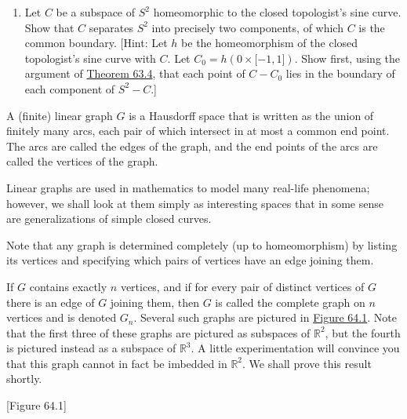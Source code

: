 \begin{enumerate}[itemsep=0.4em, parsep=0pt, topsep=0pt, partopsep=0pt, leftmargin=*, label=\arabic*., ref=\arabic*]
\begin{enumerate}[itemsep=0.2em, parsep=0pt, topsep=0pt, partopsep=0pt, leftmargin=*, label=(\alph*), align=left]
\begin{enumerate}[itemsep=0.2em, parsep=0pt, topsep=0pt, partopsep=0pt, leftmargin=*, label=(\alph*), align=left]
 \item Let \(C\) be a subspace of \(S^{2}\) homeomorphic to the closed topologist's sine curve. Show that \(C\) separates \(S^{2}\) into precisely two components, of which \(C\) is the common boundary. [Hint: Let \(h\) be the homeomorphism of the closed topologist's sine curve with \(C\). Let \(C_{0} = h( {0\times \lbrack - 1,1\rbrack })\). Show first, using the argument of \hyperref[thm:63.4]{Theorem 63.4}, that each point of \(C - C_{0}\) lies in the boundary of each component of \(S^{2} - C\).]
 \end{enumerate}
 \end{enumerate}
\end{enumerate}

A (finite) linear graph \(G\) is a Hausdorff space that is written as the union of finitely many arcs, each pair of which intersect in at most a common end point. The arcs are called the edges of the graph, and the end points of the arcs are called the vertices of the graph.

Linear graphs are used in mathematics to model many real-life phenomena; however, we shall look at them simply as interesting spaces that in some sense are generalizations of simple closed curves.

Note that any graph is determined completely (up to homeomorphism) by listing its vertices and specifying which pairs of vertices have an edge joining them.

\begin{centeredblock}
\begin{example}
\label{ex:\thesection.\theexample}
If \(G\) contains exactly \(n\) vertices, and if for every pair of distinct vertices of \(G\) there is an edge of \(G\) joining them, then \(G\) is called the complete graph on \(n\) vertices and is denoted \(G_{n}\). Several such graphs are pictured in \hyperref[fig:64.1]{Figure 64.1}. Note that the first three of these graphs are pictured as subspaces of \(\mathbb{R}^{2}\), but the fourth is pictured instead as a subspace of \(\mathbb{R}^{3}\). A little experimentation will convince you that this graph cannot in fact be imbedded in \(\mathbb{R}^{2}\). We shall prove this result shortly.

[Figure 64.1]
\end{example}
\end{centeredblock}

